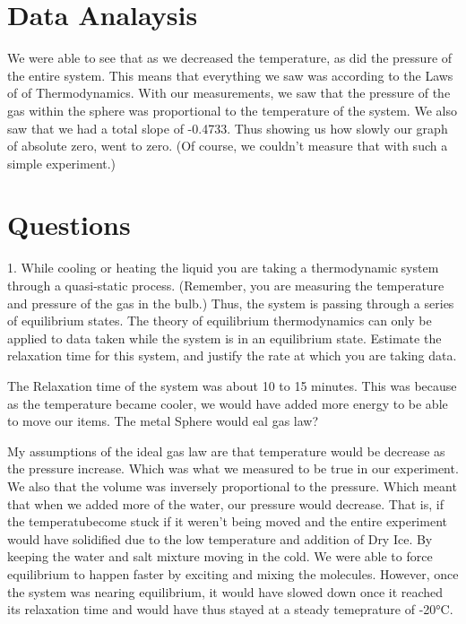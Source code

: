 \documentclass[12pt]{report}
\begin{document}
\section{Data Analaysis}
	
	We were able to see that as we decreased the temperature, as did the pressure of the entire system. This means that everything  we saw was according to the Laws of of Thermodynamics. With our measurements, we saw that the pressure of the gas within the sphere was proportional to the temperature of the system. We also saw that we had a total slope of -0.4733. Thus showing us how slowly our graph of absolute zero, went to zero. (Of course, we couldn't measure that with such a simple experiment.)

\section{Questions}
	1. While cooling or heating the liquid you are taking a thermodynamic system through a quasi-static process. (Remember, you are measuring the temperature and pressure of the gas in the bulb.) Thus,
the system is passing through a series of equilibrium states. The theory of equilibrium thermodynamics
can only be applied to data taken while the system is in an equilibrium state. Estimate the relaxation
time for this system, and justify the rate at which you are taking data.


	The Relaxation time of the system was about 10 to 15 minutes. This was because as the temperature became cooler, we would have added more energy to be able to move our items. The metal Sphere would eal gas law?

	My assumptions of the ideal gas law are that temperature would be decrease as the pressure increase. Which was what we measured to be true in our experiment. We also that the volume was inversely proportional to the pressure. Which meant that when we added more of the water, our pressure would decrease. That is, if the temperatubecome stuck if it weren't being moved and the entire experiment would have solidified due to the low temperature and addition of Dry Ice. By keeping the water and salt mixture moving in the cold. We were able to force equilibrium to happen faster by exciting and mixing the molecules. However, once the system was nearing equilibrium, it would have slowed down once it reached its relaxation time and would have thus stayed at a steady temeprature of -20°C.
\end{document}

